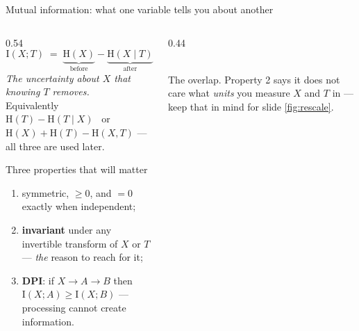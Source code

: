 \documentclass[aspectratio=169,11pt]{beamer}
\newcommand{\I}{\mathrm{I}}
\newcommand{\HH}{\mathrm{H}}
\begin{document}
\begin{frame}{Mutual information: what one variable tells you about another}
\begin{columns}[T]
\begin{column}{0.54\textwidth}
\[ \I(X;T) \;=\; \underbrace{\HH(X)}_{\text{before}} - \underbrace{\HH(X\mid T)}_{\text{after}} \]
\emph{The uncertainty about $X$ that knowing $T$ removes.}\\[4pt]
{\small Equivalently \ $\HH(T)-\HH(T\mid X)$ \ or \ $\HH(X)+\HH(T)-\HH(X,T)$ ---
all three are used later.}
\medskip
\begin{block}{\small Three properties that will matter}
\footnotesize
\begin{enumerate}
  \item symmetric, $\ge 0$, and $=0$ exactly when independent;
  \item \textbf{invariant} under any invertible transform of $X$ or $T$ ---
        \emph{the} reason to reach for it;
  \item \textbf{DPI}: if $X\to A\to B$ then $\I(X;A)\ge\I(X;B)$ --- processing cannot
        create information.
\end{enumerate}
\end{block}
\end{column}
\begin{column}{0.44\textwidth}
\centering
{}
\\[4pt]
\footnotesize The overlap. Property 2 says it does not care what \emph{units} you
measure $X$ and $T$ in --- keep that in mind for slide \ref{fig:rescale}.
\end{column}
\end{columns}
\end{frame}
\end{document}
